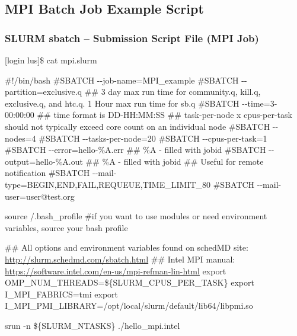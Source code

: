 \documentclass[t,hyperref={pdfpagelabels=false}]{beamer}
\newcommand{\ctilde}{{\fontfamily{ptm}\selectfont\texttildelow}}
\newcommand{\ddash}{-{}-}
\begin{document}
\subsection{MPI Batch Job Example Script}
\begin{frame}[fragile]
\frametitle{SLURM sbatch -- Submission Script File (MPI Job)}
\begin{semiverbatim}\tiny
[login lus]\$ cat mpi.slurm

\#!/bin/bash
\#SBATCH \ddash{}job-name=MPI\_example
\#SBATCH \ddash{}partition=exclusive.q
\#\# 3 day max run time for community.q, kill.q, exclusive.q, and htc.q.  1 Hour max run time for sb.q
\#SBATCH \ddash{}time=3-00:00:00 ## time format is DD-HH:MM:SS
\#\# task-per-node x cpus-per-task should not typically exceed core count on an individual node 
\#SBATCH \ddash{}nodes=4
\#SBATCH \ddash{}tasks-per-node=20
\#SBATCH \ddash{}cpus-per-task=1
\#SBATCH \ddash{}error=hello-\%A.err \#\# \%A - filled with jobid
\#SBATCH \ddash{}output=hello-\%A.out \#\# \%A - filled with jobid
\#\# Useful for remote notification
\#SBATCH \ddash{}mail-type=BEGIN,END,FAIL,REQUEUE,TIME\_LIMIT\_80
\#SBATCH \ddash{}mail-user=user@test.org

source \ctilde/.bash_profile \#if you want to use modules or need environment variables, source your bash profile

\#\# All options and environment variables found on schedMD site: \href{http://slurm.schedmd.com/sbatch.html}{http://slurm.schedmd.com/sbatch.html}
\#\# Intel MPI manual: \href{https://software.intel.com/en-us/mpi-refman-lin-html}{https://software.intel.com/en-us/mpi-refman-lin-html}
export OMP\_NUM\_THREADS=\$\{SLURM\_CPUS\_PER\_TASK\}
export I\_MPI\_FABRICS=tmi  
export I\_MPI\_PMI\_LIBRARY=/opt/local/slurm/default/lib64/libpmi.so

srun  -n \$\{SLURM\_NTASKS\}  ./hello\_mpi.intel 
\end{semiverbatim}
\end{frame}
\end{document}
